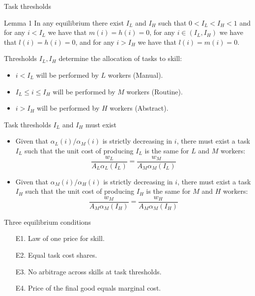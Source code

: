 \documentclass[notes=show]{beamer}
\begin{document}
\begin{frame}{Task thresholds}
\begin{block}{Lemma 1}
In any equilibrium there exist $I_{L}$ and $I_{H}$ such that $0 < I_{L} < I_{H} < 1$ and for any $i < I_{L}$ we have that $m(i)=h(i)=0$, for any $i \in (I_{L},I_{H})$ we have that $l(i)=h(i)=0$, and for any $i > I_{H}$ we have that $l(i)=m(i)=0$.
\end{block}
Thresholds $I_{L}, I_{H}$ determine the allocation of tasks to skill: \medskip
\begin{itemize}
\item $i < I_{L}$ will be performed by $L$ workers (Manual). \medskip
\item $I_{L} \leq i \leq I_{H}$ will be performed by $M$ workers (Routine). \medskip
\item $i > I_{H}$ will be performed by $H$ workers (Abstract).
\end{itemize}
\end{frame}

\begin{frame}{Task thresholds $I_{L}$ and $I_{H}$ must exist}
\begin{itemize}
\item Given that $\alpha_{L}(i) / \alpha_{M}(i)$ is strictly decreasing in $i$, there must exist a task $I_{L}$ such that the unit cost of producing $I_{L}$ is the same for $L$ and $M$ workers:
\[
\frac{w_{L}}{A_{L} \alpha_{L}(I_{L})} = \frac{w_{M}}{A_{M} \alpha_{M}(I_{L})}
\]
\item Given that $\alpha_{M}(i) / \alpha_{H}(i)$ is strictly decreasing in $i$, there must exist a task $I_{H}$ such that the unit cost of producing $I_{H}$ is the same for $M$ and $H$ workers:
\[
\frac{w_{M}}{A_{M} \alpha_{M}(I_{H})} = \frac{w_{H}}{A_{M} \alpha_{M}(I_{H})}
\]
\end{itemize}
\end{frame}

\begin{frame}{Three equilibrium conditions}
\begin{enumerate}
\item[E1.] Law of one price for skill. \bigskip
\item[E2.] Equal task cost shares.\bigskip
\item[E3.] No arbitrage across skills at task thresholds. \bigskip
\item[E4.] Price of the final good equals marginal cost.
\end{enumerate}
\end{frame}
\end{document}
